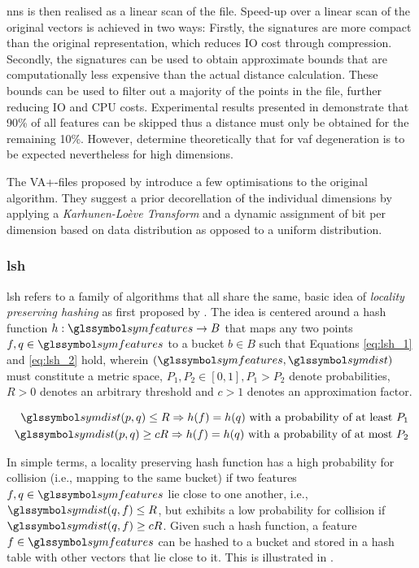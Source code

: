 \acrshort{nns} is then realised as a linear scan of the file. Speed-up over a linear scan of the original vectors is achieved in two ways: Firstly, the signatures are more compact than the original representation, which reduces IO cost through compression. Secondly, the signatures can be used to obtain approximate bounds that are computationally less expensive than the actual distance calculation. These bounds can be used to filter out a majority of the points in the file, further reducing IO and CPU costs. Experimental results presented in \cite{Weber:1998Va} demonstrate that 90\% of all features can be skipped thus a distance must only be obtained for the remaining 10\%. However, \cite{Echihabi:2021High} determine theoretically that for \acrshort{vaf} degeneration is to be expected nevertheless for high dimensions.

The VA+-files proposed by \cite{Ferhatosmanoglu:2000Vector} introduce a few optimisations to the original algorithm. They suggest a prior decorellation of the individual dimensions by applying a \emph{Karhunen-Loève Transform} and a dynamic assignment of bit per dimension based on data distribution as opposed to a uniform distribution.

\subsubsection{\acrfull{lsh}}

\acrshort{lsh} refers to a family of algorithms \cite{Echihabi:2021High,Wang:2017ASurvey} that all share the same, basic idea of \emph{locality preserving hashing} as first proposed by \cite{Indyk1998:Approximate}. The idea is centered around a hash function $h: \symfeatures \rightarrow B$ that maps any two points $f,q \in \symfeatures$ to a bucket $b \in B$ such that Equations \ref{eq:lsh_1} and \ref{eq:lsh_2} hold, wherein $(\symfeatures, \symdist)$ must constitute a metric space, $P_1, P_2 \in [0, 1], P_1 > P_2$ denote probabilities, $R > 0$ denotes an arbitrary threshold and $c > 1$ denotes an approximation factor.

\begin{eqnarray}
    \symdist (p,q) \leq R \Rightarrow h(f) = h(q) \text{ with a probability of at least } P_1 \label{eq:lsh_1} \\
    \symdist (p,q) \geq cR \Rightarrow h(f) = h(q) \text{ with a probability of at most } P_2 \label{eq:lsh_2}
\end{eqnarray}

In simple terms, a locality preserving hash function has a high probability for collision (i.e., mapping to the same bucket) if two features $f,q \in \symfeatures$ lie close to one another, i.e., $\symdist(q,f) \leq R$, but exhibits a low probability for collision if $\symdist(q,f) \geq cR$. Given such a hash function, a feature $f \in \symfeatures$ can be hashed to a bucket and stored in a hash table with other vectors that lie close to it. This is illustrated in . 

